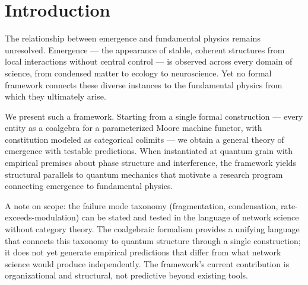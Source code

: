 \documentclass[12pt,a4paper]{article}
\begin{document}
\begin{abstract}
A cross-domain null model comparison across three networks --- an ecological food web (Martinez, 1991), a cancer driver gene network (STRING/COSMIC), and the \textit{C.~elegans} connectome (White et al., 1986) --- finds that the food web fragmentation signature is structural (configuration model nulls with the same degree sequence produce the opposite signature, $p < 0.01$). The cancer condensation trajectory is a negative result --- it is a degree-sequence artifact indistinguishable from random rewiring ($p = 0.58$). The connectome shows structural baseline concentration and greater robustness than any same-degree null. The ecology result is the strongest: the food web's topology actively resists what its own degree sequence would predict.
\end{abstract}

\section{Introduction}
\label{sec:introduction}

The relationship between emergence and fundamental physics remains unresolved. Emergence --- the appearance of stable, coherent structures from local interactions without central control --- is observed across every domain of science, from condensed matter to ecology to neuroscience. Yet no formal framework connects these diverse instances to the fundamental physics from which they ultimately arise.

We present such a framework. Starting from a single formal construction --- every entity as a coalgebra for a parameterized Moore machine functor, with constitution modeled as categorical colimits --- we obtain a general theory of emergence with testable predictions. When instantiated at quantum grain with empirical premises about phase structure and interference, the framework yields structural parallels to quantum mechanics that motivate a research program connecting emergence to fundamental physics.

A note on scope: the failure mode taxonomy (fragmentation, condensation, rate-exceeds-modulation) can be stated and tested in the language of network science without category theory. The coalgebraic formalism provides a unifying language that connects this taxonomy to quantum structure through a single construction; it does not yet generate empirical predictions that differ from what network science would produce independently. The framework's current contribution is organizational and structural, not predictive beyond existing tools.
\end{document}
